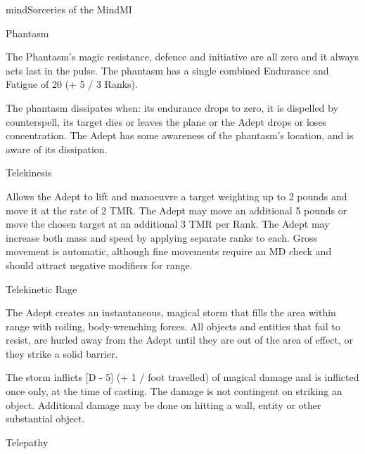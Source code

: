 \begin{College}[1.6]{mind}{Sorceries of the Mind}{MI}
\begin{spell}[S-6]{Phantasm}
\begin{effects}
The Phantasm’s magic resistance, defence and initiative are all zero
and it always acts last in the pulse. The phantasm has a single
combined Endurance and Fatigue of 20 (+ 5 / 3 Ranks).

The phantasm dissipates when: its endurance drops to zero, it is
dispelled by counterspell, its target dies or leaves the plane or the
Adept drops or loses concentration.  The Adept has some awareness of
the phantasm’s location, and is aware of its dissipation.
\end{effects}
\end{spell}

\begin{spell}[S-7]{Telekinesis}

\begin{effects}
Allows the Adept to lift and manoeuvre a target weighting up to 2
pounds and move it at the rate of 2 TMR. The Adept may move an
additional 5 pounds or move the chosen target at an additional 3 TMR
per Rank.  The Adept may increase both mass and speed by applying
separate ranks to each.  Gross movement is automatic, although fine
movements require an MD check and should attract negative modifiers
for range.
\end{effects}
\end{spell}

\begin{spell}[S-8]{Telekinetic Rage}

\begin{effects}
The Adept creates an instantaneous, magical storm that fills the area
within range with roiling, body-wrenching forces.  All objects and
entities that fail to resist, are hurled away from the Adept until
they are out of the area of effect, or they strike a solid barrier.

The storm inflicts [D - 5] (+ 1 / foot travelled) of magical damage
and is inflicted once only, at the time of casting.  The damage is not
contingent on striking an object. Additional damage may be done on
hitting a wall, entity or other substantial object.
\end{effects}
\end{spell}

\begin{spell}[S-9]{Telepathy}


\end{spell}
\end{College}
